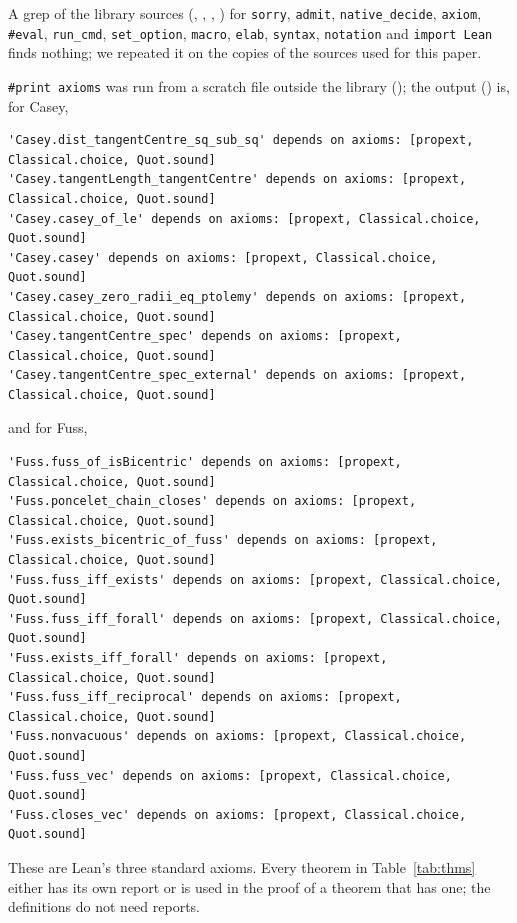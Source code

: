 \documentclass[11pt]{article}
\theoremstyle{definition}
\theoremstyle{remark}
\newcommand{\code}[1]{\texttt{#1}}
\begin{document}
A grep of the library sources (, , , ) for
\code{sorry}, \code{admit}, \code{native\_decide}, \code{axiom}, \code{\#eval}, \code{run\_cmd},
\code{set\_option}, \code{macro}, \code{elab}, \code{syntax}, \code{notation} and \code{import Lean}
finds nothing; we repeated it on the copies of the sources used for this paper.

{\lstset{basicstyle=\ttfamily\scriptsize}\code{\#print axioms} was run from a scratch file outside the library (); the
output () is, for Casey,
\begin{lstlisting}
'Casey.dist_tangentCentre_sq_sub_sq' depends on axioms: [propext, Classical.choice, Quot.sound]
'Casey.tangentLength_tangentCentre' depends on axioms: [propext, Classical.choice, Quot.sound]
'Casey.casey_of_le' depends on axioms: [propext, Classical.choice, Quot.sound]
'Casey.casey' depends on axioms: [propext, Classical.choice, Quot.sound]
'Casey.casey_zero_radii_eq_ptolemy' depends on axioms: [propext, Classical.choice, Quot.sound]
'Casey.tangentCentre_spec' depends on axioms: [propext, Classical.choice, Quot.sound]
'Casey.tangentCentre_spec_external' depends on axioms: [propext, Classical.choice, Quot.sound]
\end{lstlisting}
and for Fuss,
\begin{lstlisting}
'Fuss.fuss_of_isBicentric' depends on axioms: [propext, Classical.choice, Quot.sound]
'Fuss.poncelet_chain_closes' depends on axioms: [propext, Classical.choice, Quot.sound]
'Fuss.exists_bicentric_of_fuss' depends on axioms: [propext, Classical.choice, Quot.sound]
'Fuss.fuss_iff_exists' depends on axioms: [propext, Classical.choice, Quot.sound]
'Fuss.fuss_iff_forall' depends on axioms: [propext, Classical.choice, Quot.sound]
'Fuss.exists_iff_forall' depends on axioms: [propext, Classical.choice, Quot.sound]
'Fuss.fuss_iff_reciprocal' depends on axioms: [propext, Classical.choice, Quot.sound]
'Fuss.nonvacuous' depends on axioms: [propext, Classical.choice, Quot.sound]
'Fuss.fuss_vec' depends on axioms: [propext, Classical.choice, Quot.sound]
'Fuss.closes_vec' depends on axioms: [propext, Classical.choice, Quot.sound]
\end{lstlisting}}
These are Lean's three standard axioms. Every theorem in Table~\ref{tab:thms} either has its own
report or is used in the proof of a theorem that has one; the definitions do not need reports.
\end{document}

